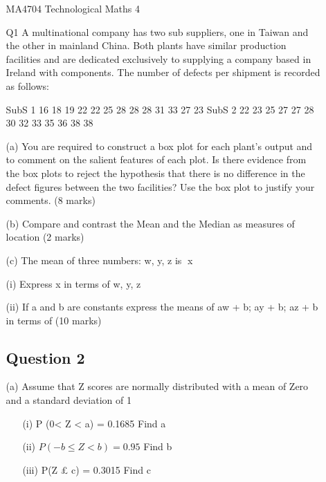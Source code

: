 \documentclass[]{report}
\begin{document}
\begin{enumerate}[(i)]
\begin{itemize}
	
	MA4704 Technological Maths 4 
	
	Q1
	A multinational company has two sub suppliers, one in Taiwan and the other in mainland China.  Both plants have similar production facilities and are dedicated exclusively to supplying a company based in Ireland with components.
	The number of defects per shipment is recorded as follows:
	
	SubS 1	16	18	19	22	22	25	28	28	28	31	33	27	23
	SubS 2	22	23	25	27	27	28	30	32	33	35	36	38	38
	
	(a)	You are required to construct a box plot for each plant’s output and to comment on the salient features of each plot.  Is there evidence from the box plots to reject the hypothesis that there is no difference in the defect figures between the two facilities?  Use the box plot to justify your comments.
	(8 marks)
	
	(b)	Compare and contrast the Mean and the Median as measures of location
	(2 marks)
	
	(c)	The mean of three numbers: w, y, z is x
	
	\item[(i)]Express x in terms of w, y, z
	\item[(ii)] If a and b are constants express the means of 
	aw + b;   ay + b;   az + b
	in terms of  
	(10 marks)
	
	
	\subsection{Question 2}
	
	(a)	
	Assume that Z scores are normally distributed with a mean of Zero and a
	standard deviation of 1
	
	\begin{itemize} 
		\item[(i)] 	P (0< Z < a)  =  0.1685 			 Find   a 
		\item[(ii)]           $ P(- b \leq Z < b) =  0.95	$	            	 Find   b
		\item[(iii)]             P(Z £ c)  =       0.3015 			 Find   c
	\end{itemize}
	
%	
%	


\end{itemize}
\end{enumerate}
\end{document}
